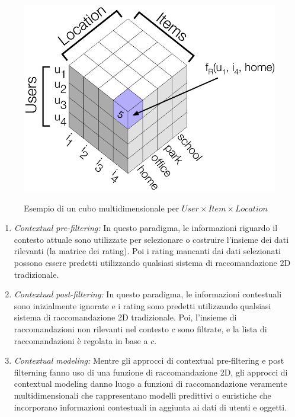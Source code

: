 \begin{figure}
  \centering
  \includegraphics[scale=0.75]{immagini/rating_cube.png}
  \caption{Esempio di un cubo multidimensionale per $User \times Item \times Location$}
  \cite{survey-mattia}
  \label{fig:ratings-cube}
\end{figure}

\begin{enumerate}
 \item \textit{Contextual pre-filtering:} In questo paradigma, le informazioni riguardo il contesto attuale sono utilizzate per selezionare o costruire l'insieme dei dati rilevanti (la matrice dei rating). Poi i rating mancanti dai dati selezionati possono essere predetti utilizzando qualsiasi sistema di raccomandazione 2D tradizionale.
 \item \textit{Contextual post-filtering:} In questo paradigma, le informazioni contestuali sono inizialmente ignorate e i rating sono predetti utilizzando qualsiasi sistema di raccomandazione 2D tradizionale. Poi, l'insieme di raccomandazioni non rilevanti nel contesto $c$ sono filtrate, e la lista di raccomandazioni è regolata in base a $c$.
 \item  \textit{Contextual modeling:} Mentre gli approcci di contextual pre-filtering e post filterning fanno uso di una funzione di raccomandazione 2D, gli approcci di contextual modeling danno luogo a funzioni di raccomandazione veramente multidimensionali che rappresentano modelli predittivi o euristiche che incorporano informazioni contestuali in aggiunta ai dati di utenti e oggetti.
\end{enumerate}

